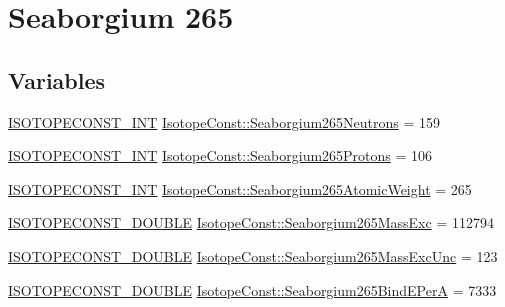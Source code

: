 \hypertarget{group___isotope_const-_seaborgium-_sg265}{}\section{Seaborgium 265}
\label{group___isotope_const-_seaborgium-_sg265}
\subsection*{Variables}
\begin{DoxyCompactItemize}
\item 
\mbox{\hyperlink{group___isotope_const-_macros_ga5f18360b3e99483a35c32d789e62621c}{I\+S\+O\+T\+O\+P\+E\+C\+O\+N\+S\+T\+\_\+\+I\+NT}} \mbox{\hyperlink{group___isotope_const-_seaborgium-_sg265_ga61c308439654e3495a34700244d7088d}{Isotope\+Const\+::\+Seaborgium265\+Neutrons}} = 159
\item 
\mbox{\hyperlink{group___isotope_const-_macros_ga5f18360b3e99483a35c32d789e62621c}{I\+S\+O\+T\+O\+P\+E\+C\+O\+N\+S\+T\+\_\+\+I\+NT}} \mbox{\hyperlink{group___isotope_const-_seaborgium-_sg265_ga643ba38505087aab8a070d0a57505f8c}{Isotope\+Const\+::\+Seaborgium265\+Protons}} = 106
\item 
\mbox{\hyperlink{group___isotope_const-_macros_ga5f18360b3e99483a35c32d789e62621c}{I\+S\+O\+T\+O\+P\+E\+C\+O\+N\+S\+T\+\_\+\+I\+NT}} \mbox{\hyperlink{group___isotope_const-_seaborgium-_sg265_ga9c99302deac65cc8394a3ae4f77cfa28}{Isotope\+Const\+::\+Seaborgium265\+Atomic\+Weight}} = 265
\item 
\mbox{\hyperlink{group___isotope_const-_macros_ga8f45a7272ce02c0b4c65c44636ed719a}{I\+S\+O\+T\+O\+P\+E\+C\+O\+N\+S\+T\+\_\+\+D\+O\+U\+B\+LE}} \mbox{\hyperlink{group___isotope_const-_seaborgium-_sg265_gadb97d33561fab54c61db1853f41f8baf}{Isotope\+Const\+::\+Seaborgium265\+Mass\+Exc}} = 112794
\item 
\mbox{\hyperlink{group___isotope_const-_macros_ga8f45a7272ce02c0b4c65c44636ed719a}{I\+S\+O\+T\+O\+P\+E\+C\+O\+N\+S\+T\+\_\+\+D\+O\+U\+B\+LE}} \mbox{\hyperlink{group___isotope_const-_seaborgium-_sg265_gaf89a0993a771558723daab553c30ae5c}{Isotope\+Const\+::\+Seaborgium265\+Mass\+Exc\+Unc}} = 123
\item 
\mbox{\hyperlink{group___isotope_const-_macros_ga8f45a7272ce02c0b4c65c44636ed719a}{I\+S\+O\+T\+O\+P\+E\+C\+O\+N\+S\+T\+\_\+\+D\+O\+U\+B\+LE}} \mbox{\hyperlink{group___isotope_const-_seaborgium-_sg265_ga0f997638486887d7c95b567fc66841b8}{Isotope\+Const\+::\+Seaborgium265\+Bind\+E\+PerA}} = 7333
\item 

\end{DoxyCompactItemize}
